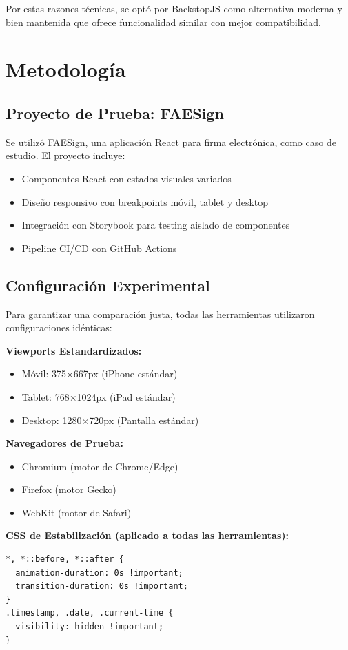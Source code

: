 \documentclass{article}
\begin{document}
Por estas razones técnicas, se optó por BackstopJS como alternativa moderna y bien mantenida que ofrece funcionalidad similar con mejor compatibilidad.

\section{Metodología}

\subsection{Proyecto de Prueba: FAESign}
Se utilizó FAESign, una aplicación React para firma electrónica, como caso de estudio. El proyecto incluye:
\begin{itemize}[nosep]
\item Componentes React con estados visuales variados
\item Diseño responsivo con breakpoints móvil, tablet y desktop
\item Integración con Storybook para testing aislado de componentes
\item Pipeline CI/CD con GitHub Actions
\end{itemize}

\subsection{Configuración Experimental}
Para garantizar una comparación justa, todas las herramientas utilizaron configuraciones idénticas:

\textbf{Viewports Estandardizados:}
\begin{itemize}[nosep]
\item Móvil: 375×667px (iPhone estándar)
\item Tablet: 768×1024px (iPad estándar)  
\item Desktop: 1280×720px (Pantalla estándar)
\end{itemize}

\textbf{Navegadores de Prueba:}
\begin{itemize}[nosep]
\item Chromium (motor de Chrome/Edge)
\item Firefox (motor Gecko)
\item WebKit (motor de Safari)
\end{itemize}

\textbf{CSS de Estabilización (aplicado a todas las herramientas):}
\begin{verbatim}
*, *::before, *::after {
  animation-duration: 0s !important;
  transition-duration: 0s !important;
}
.timestamp, .date, .current-time {
  visibility: hidden !important;
}
\end{verbatim}
\end{document}
